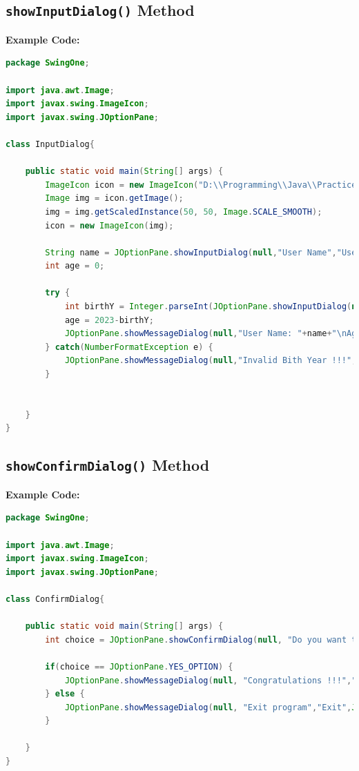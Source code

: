 \subsection{\texttt{showInputDialog()} Method}
\textbf{Example Code:}
\begin{lstlisting}[language=java]
package SwingOne;

import java.awt.Image;
import javax.swing.ImageIcon;
import javax.swing.JOptionPane;

class InputDialog{
	
	public static void main(String[] args) {
		ImageIcon icon = new ImageIcon("D:\\Programming\\Java\\PracticeProject\\Swing\\Icons\\user_Icon.png");
		Image img = icon.getImage();
		img = img.getScaledInstance(50, 50, Image.SCALE_SMOOTH);
		icon = new ImageIcon(img);
		
		String name = JOptionPane.showInputDialog(null,"User Name","User Info",JOptionPane.INFORMATION_MESSAGE);
		int age = 0;
		
		try {
			int birthY = Integer.parseInt(JOptionPane.showInputDialog(null,"Birth Year: ","User Info",JOptionPane.INFORMATION_MESSAGE));
			age = 2023-birthY;
			JOptionPane.showMessageDialog(null,"User Name: "+name+"\nAge: "+age,"User Info",JOptionPane.DEFAULT_OPTION,icon);
		} catch(NumberFormatException e) {
			JOptionPane.showMessageDialog(null,"Invalid Bith Year !!!","Warning",JOptionPane.WARNING_MESSAGE);
		}
		
		
	}
}
\end{lstlisting}



\newpage
\subsection{\texttt{showConfirmDialog()} Method}

\textbf{Example Code:}
\begin{lstlisting}[language=java]
package SwingOne;

import java.awt.Image;
import javax.swing.ImageIcon;
import javax.swing.JOptionPane;

class ConfirmDialog{
	
	public static void main(String[] args) {
		int choice = JOptionPane.showConfirmDialog(null, "Do you want to Execute this Program ?","Confirmation",JOptionPane.YES_NO_OPTION,JOptionPane.QUESTION_MESSAGE);
		
		if(choice == JOptionPane.YES_OPTION) {
			JOptionPane.showMessageDialog(null, "Congratulations !!!","Execute",JOptionPane.INFORMATION_MESSAGE);
		} else {
			JOptionPane.showMessageDialog(null, "Exit program","Exit",JOptionPane.WARNING_MESSAGE);
		}
		
	}
}
\end{lstlisting}


